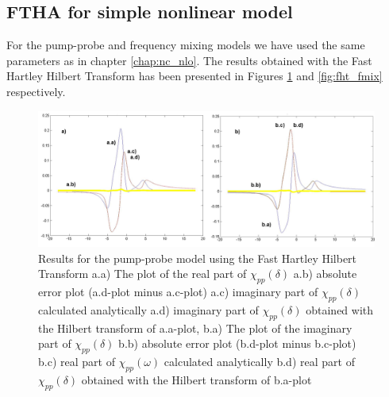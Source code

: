 \documentclass[12pt,twoside,a4paper]{article}
\numberwithin{equation}{subsection}
\numberwithin{figure}{subsection}
\begin{document}
\subsection{FTHA for simple nonlinear model} \label{chap:hartley_nlo}

For the pump-probe and frequency mixing models we have used the same parameters as in chapter \ref{chap:nc_nlo}. The results
obtained with the Fast Hartley Hilbert Transform has been presented in Figures \ref{fig:fht_pnp} and \ref{fig:fht_fmix}
respectively.

\begin{figure} 
  \includegraphics[width=150mm]{img/fht_pnp.png}
  \caption{Results for the pump-probe model using the Fast Hartley Hilbert Transform
     a.a) The plot of the real part of ${\chi_{pp}}(\delta )$
     a.b) absolute error plot (a.d-plot minus a.c-plot) 
     a.c) imaginary part of ${\chi_{pp}}(\delta )$ calculated analytically 
     a.d) imaginary part of ${\chi_{pp}}(\delta )$ obtained with the Hilbert transform of a.a-plot, 
     b.a) The plot of the imaginary part of ${\chi_{pp}}(\delta )$ 
     b.b) absolute error plot (b.d-plot minus b.c-plot) 
     b.c) real part of $\chi_{pp} (\omega )$ calculated analytically 
     b.d) real part of ${\chi_{pp}}(\delta )$ obtained with the Hilbert transform of b.a-plot 
     \label{fig:fht_pnp}
     }
\end{figure} 
\end{document}
